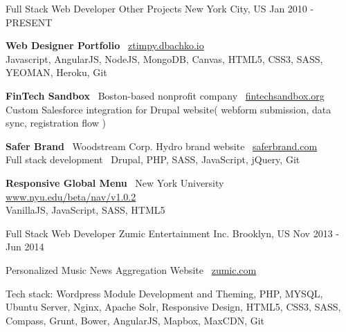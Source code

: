 \begin{cventries}
  \cventry
    {Full Stack Web Developer} %
    {Other Projects} %
    {New York City, US} %
    {Jan 2010 - PRESENT} %
    {
      \begin{cvitems} %
        \item {\textbf{Web Designer Portfolio} \guillemotright\, \color{awesome}\href{http://ztimpy.dbachko.io}{ztimpy.dbachko.io} \\
        \color{text}Javascript, AngularJS, NodeJS, MongoDB, Canvas, HTML5, CSS3, SASS, YEOMAN, Heroku, Git}
        \item {\textbf{FinTech Sandbox} \guillemotright\, Boston-based nonprofit company \guillemotright\, \color{awesome}\href{http://fintechsandbox.org}{fintechsandbox.org}\\
        \color{text}Custom Salesforce integration for Drupal website( webform submission, data sync, registration flow )}
        \item {\textbf{Safer Brand} \guillemotright\, Woodstream Corp. Hydro brand website \guillemotright\, \color{awesome}\href{http://www.saferbrand.com/}{saferbrand.com}\\
        \color{text}Full stack development \guillemotright\, Drupal, PHP, SASS, JavaScript, jQuery, Git}
        \item {\textbf{Responsive Global Menu} \guillemotright\, New York University \guillemotright\, \color{awesome}\href{http://www.nyu.edu/beta/nav/v1.0.2/}{www.nyu.edu/beta/nav/v1.0.2}\\
        \color{text}VanillaJS, JavaScript, SASS, HTML5}
      \end{cvitems}
    }

  \cventry
    {Full Stack Web Developer} %
    {Zumic Entertainment Inc.} %
    {Brooklyn, US} %
    {Nov 2013 - Jun 2014} %
    {
      \begin{cvitems} %
        \item {Personalized Music News Aggregation Website \guillemotright\, \color{awesome}\href{http://zumic.com}{zumic.com}}
        \item {Tech stack: Wordpress Module Development and Theming, PHP, MYSQL, Ubuntu Server, Nginx, Apache Solr, Responsive Design, HTML5, CSS3, SASS, Compass, Grunt, Bower, AngularJS, Mapbox, MaxCDN, Git}
      \end{cvitems}
    }


\end{cventries}
